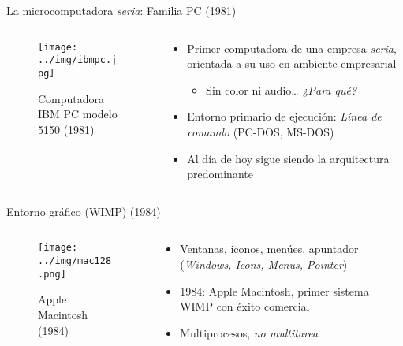 \documentclass[presentation]{beamer}
\begin{document}
\begin{frame}[label={sec:org2ca4b8d}]{La microcomputadora \emph{seria}: Familia PC (1981)}
\begin{columns}\begin{column}{0.3\textwidth}
\begin{figure}[htbp]
\centering
\texttt{[image: ../img/ibmpc.jpg]}
\caption{Computadora IBM PC modelo 5150 (1981)}
\end{figure}
\end{column}\begin{column}{0.6\textwidth}
\begin{itemize}
\item Primer computadora de una empresa \emph{seria}, orientada a su uso en
ambiente empresarial
\begin{itemize}
\item Sin color ni audio\ldots{} \emph{¿Para qué?}
\end{itemize}
\item Entorno primario de ejecución: \emph{Línea de comando} (PC-DOS, MS-DOS)
\item Al día de hoy sigue siendo la arquitectura predominante
\end{itemize}
\end{column}\end{columns}
\end{frame}

\begin{frame}[label={sec:orga1d57ec}]{Entorno gráfico (WIMP) (1984)}
\begin{columns}\begin{column}{0.3\textwidth}
\begin{figure}[htbp]
\centering
\texttt{[image: ../img/mac128.png]}
\caption{Apple Macintosh (1984)}
\end{figure}
\end{column}\begin{column}{0.6\textwidth}
\begin{itemize}
\item Ventanas, iconos, menúes, apuntador (\emph{Windows, Icons, Menus,
Pointer})
\item 1984: Apple Macintosh, primer sistema WIMP con éxito comercial
\item Multiprocesos, \emph{no multitarea}
\end{itemize}
\end{column}\end{columns}
\end{frame}
\end{document}
